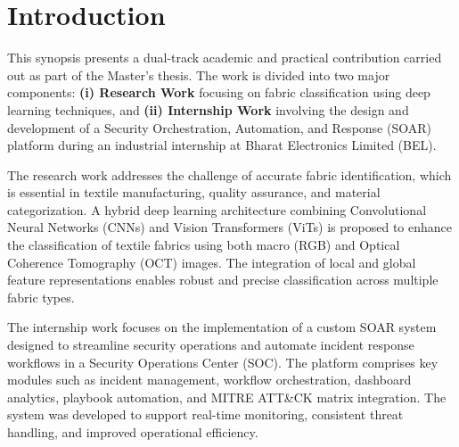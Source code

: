 \documentclass[12pt, twoside, a4paper]{report}
\author{Mayank Jatav}
\begin{document}

\pagestyle{fancy}

\fancyhead[EL, OR]{\thepage}
\fancyhead[ER]{\nouppercase{\leftmark}}
\fancyhead[OL]{\nouppercase{\rightmark}}

\renewcommand{\sectionmark}[1]{\markright{\thesection\ #1}}




\renewcommand{\thesection}{\arabic{section}}
\setcounter{secnumdepth}{10}

\section*{Introduction}

This synopsis presents a dual-track academic and practical contribution carried out as part of the Master’s thesis. The work is divided into two major components: \textbf{(i) Research Work} focusing on fabric classification using deep learning techniques, and \textbf{(ii) Internship Work} involving the design and development of a Security Orchestration, Automation, and Response (SOAR) platform during an industrial internship at Bharat Electronics Limited (BEL).

The research work addresses the challenge of accurate fabric identification, which is essential in textile manufacturing, quality assurance, and material categorization. A hybrid deep learning architecture combining Convolutional Neural Networks (CNNs) and Vision Transformers (ViTs) is proposed to enhance the classification of textile fabrics using both macro (RGB) and Optical Coherence Tomography (OCT) images. The integration of local and global feature representations enables robust and precise classification across multiple fabric types.

The internship work focuses on the implementation of a custom SOAR system designed to streamline security operations and automate incident response workflows in a Security Operations Center (SOC). The platform comprises key modules such as incident management, workflow orchestration, dashboard analytics, playbook automation, and MITRE ATT\&CK matrix integration. The system was developed to support real-time monitoring, consistent threat handling, and improved operational efficiency.
\end{document}
